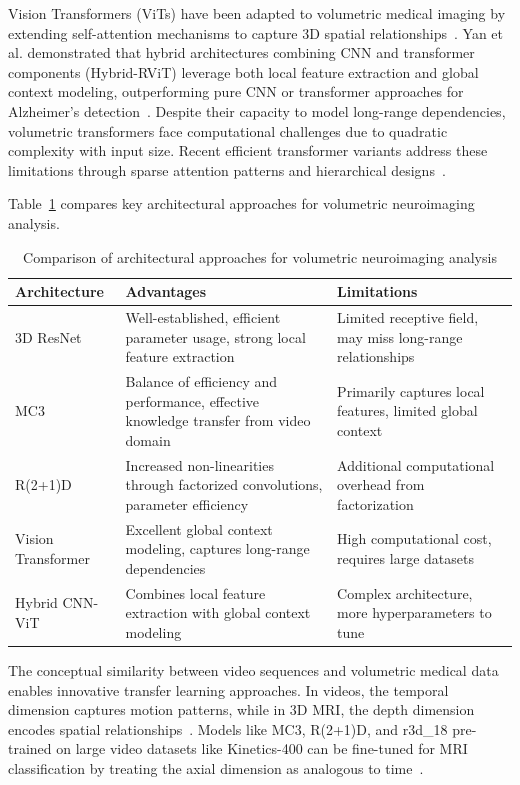 \documentclass[11pt, a4paper]{article}
\begin{document}
Vision Transformers (ViTs) have been adapted to volumetric medical imaging by extending self-attention mechanisms to capture 3D spatial relationships~\cite{lyu2022classification}. Yan et al. demonstrated that hybrid architectures combining CNN and transformer components (Hybrid-RViT) leverage both local feature extraction and global context modeling, outperforming pure CNN or transformer approaches for Alzheimer's detection~\cite{yan2025hybrid}. Despite their capacity to model long-range dependencies, volumetric transformers face computational challenges due to quadratic complexity with input size. Recent efficient transformer variants address these limitations through sparse attention patterns and hierarchical designs~\cite{lu2025efficient}.

Table~\ref{tab:architecture_comparison} compares key architectural approaches for volumetric neuroimaging analysis.

\begin{table}[htbp]
\centering
\begin{tabular}{|p{3cm}|p{5cm}|p{5cm}|}
\hline
\textbf{Architecture} & \textbf{Advantages} & \textbf{Limitations} \\
\hline
3D ResNet & Well-established, efficient parameter usage, strong local feature extraction & Limited receptive field, may miss long-range relationships \\
\hline
MC3 & Balance of efficiency and performance, effective knowledge transfer from video domain & Primarily captures local features, limited global context \\
\hline
R(2+1)D & Increased non-linearities through factorized convolutions, parameter efficiency & Additional computational overhead from factorization \\
\hline
Vision Transformer & Excellent global context modeling, captures long-range dependencies & High computational cost, requires large datasets \\
\hline
Hybrid CNN-ViT & Combines local feature extraction with global context modeling & Complex architecture, more hyperparameters to tune \\
\hline
\end{tabular}
\caption{Comparison of architectural approaches for volumetric neuroimaging analysis}
\label{tab:architecture_comparison}
\end{table}

The conceptual similarity between video sequences and volumetric medical data enables innovative transfer learning approaches. In videos, the temporal dimension captures motion patterns, while in 3D MRI, the depth dimension encodes spatial relationships~\cite{tran2018closer}. Models like MC3, R(2+1)D, and r3d\_18 pre-trained on large video datasets like Kinetics-400 can be fine-tuned for MRI classification by treating the axial dimension as analogous to time~\cite{ebrahimi2020introducing, tran2018closer}.
\end{document}
